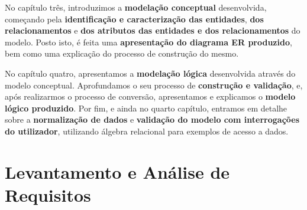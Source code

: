 \documentclass[a4paper,12pt]{scrreprt}
\begin{document}
    No capítulo três, introduzimos a \textbf{modelação conceptual} desenvolvida, começando pela \textbf{identificação e caracterização das entidades}, \textbf{dos relacionamentos} e \textbf{dos atributos das entidades e dos relacionamentos} do modelo. Posto isto, é feita uma \textbf{apresentação do diagrama ER produzido}, bem como uma explicação do processo de construção do mesmo.

    No capítulo quatro, apresentamos a \textbf{modelação lógica} desenvolvida através do modelo conceptual. Aprofundamos o seu processo de \textbf{construção e validação}, e, após realizarmos o processo de conversão, apresentamos e explicamos o \textbf{modelo lógico produzido}.
    Por fim, e ainda no quarto capítulo, entramos em detalhe sobre a \textbf{normalização de dados} e \textbf{validação do modelo com interrogações do utilizador}, utilizando álgebra relacional para exemplos de acesso a dados.



\chapter{Levantamento e Análise de Requisitos}
    \label{requisitos}
\end{document}
